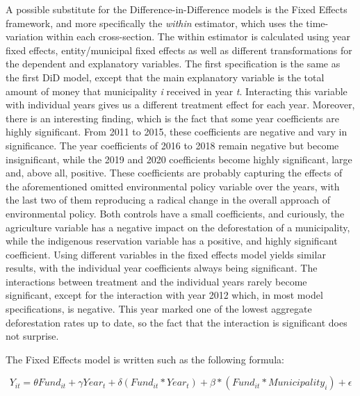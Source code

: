 \documentclass[11pt, oneside]{article}   	%
\begin{document}
A possible substitute for the Difference-in-Difference models is the Fixed Effects framework, and more specifically the \textit{within} estimator, which uses the time-variation within each cross-section. The within estimator is calculated using year fixed effects, entity/municipal fixed effects as well as different transformations for the dependent and explanatory variables. The first specification is the same as the first DiD model, except that the main explanatory variable is the total amount of money that municipality \textit{i} received in year \textit{t}. Interacting this variable with individual years gives us a different treatment effect for each year. Moreover, there is an interesting finding, which is the fact that some year coefficients are highly significant. From 2011 to 2015, these coefficients are negative and vary in significance. The year coefficients of 2016 to 2018 remain negative but become insignificant, while the 2019 and 2020 coefficients become highly significant, large and, above all, positive. These coefficients are probably capturing the effects of the aforementioned omitted environmental policy variable over the years, with the last two of them reproducing a radical change in the overall approach of environmental policy. Both controls have a small coefficients, and curiously, the agriculture variable has a negative impact on the deforestation of a municipality, while the indigenous reservation variable has a positive, and highly significant coefficient. Using different variables in the fixed effects model yields similar results, with the individual year coefficients always being significant. The interactions between treatment and the individual years rarely become significant, except for the interaction with year 2012 which, in most model specifications, is negative. This year marked one of the lowest aggregate deforestation rates up to date, so the fact that the interaction is significant does not surprise. 

The Fixed Effects model is written such as the following formula:

\begin{equation}
Y_{it} =  \theta Fund_{it}  + \gamma Year_{t} + \delta (Fund_{it} * Year_{t}) + \beta * (Fund_{it} * Municipality_{i}) + \epsilon
\end{equation}
\end{document}
